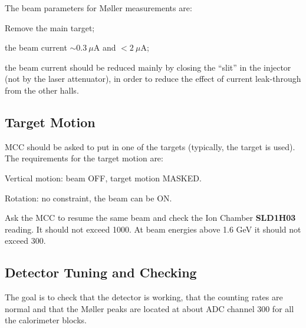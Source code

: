 { The beam parameters for M{\o}ller measurements
 are: 
   \begin{list}{--}{\setlength{\itemsep}{-0.15cm}}        
     \item Remove the main target;
     \item \begin{safetyen}{5}{0} the beam current $\sim{}0.3~\mu$A and $<2~\mu$A;
            \end{safetyen}
     \item the beam current should be reduced mainly by closing the ``slit''
           in the injector (not by the laser attenuator), in order to
           reduce the effect of current leak-through from the other halls.
   \end{list}


\subsection {Target Motion}
\label{sec:moller_oper_target}
 MCC should be asked to put in one of the targets (typically, the 
 target is used). The requirements for the target motion are:
 \begin{safetyen}{10}{10}
    \begin{list}{--}{\setlength{\itemsep}{-0.15cm}}
       \item Vertical motion: beam OFF, target motion MASKED.
       \item Rotation: no constraint, the beam can be ON. 
    \end{list}
 \end{safetyen}

 Ask the MCC to resume the same beam and check the Ion Chamber
 {\bf SLD1H03} reading. It should not exceed 1000. At beam energies
 above 1.6 GeV it should not exceed 300.

\subsection{Detector Tuning and Checking }
\label{sec:dettune}

The goal is to check that the detector is working, that the counting rates
are normal and that the M{\o}ller peaks are located at about ADC channel 300
for all the calorimeter blocks.

}
